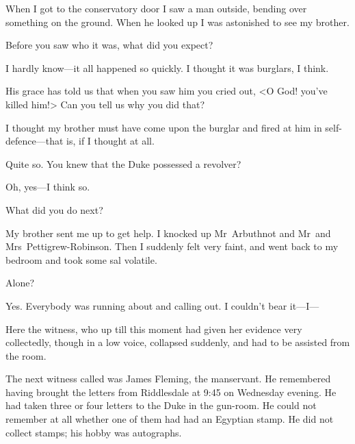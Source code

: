 \begin{dialogue}
  When I got to the conservatory door I saw a man outside, bending over something on the ground. When he looked up I was astonished to see my brother.

 Before you saw who it was, what did you expect?

 I hardly know—it all happened so quickly. I thought it was burglars, I think.

 His grace has told us that when you saw him you cried out, <O God! you've killed him!> Can you tell us why you did that?

  I thought my brother must have come upon the burglar and fired at him in self-defence—that is, if I thought at all.

 Quite so. You knew that the Duke possessed a revolver?

 Oh, yes—I think so.

 What did you do next?

 My brother sent me up to get help. I knocked up Mr~Arbuthnot and Mr~and Mrs~Pettigrew-Robinson. Then I suddenly felt very faint, and went back to my bedroom and took some sal volatile.

 Alone?

 Yes. Everybody was running about and calling out. I couldn't bear it—I—
\end{dialogue}

Here the witness, who up till this moment had given her evidence very collectedly, though in a low voice, collapsed suddenly, and had to be assisted from the room.


The next witness called was James Fleming, the manservant. He remembered having brought the letters from Riddlesdale at 9:45 on Wednesday evening. He had taken three or four letters to the Duke in the gun-room. He could not remember at all whether one of them had had an Egyptian stamp. He did not collect stamps; his hobby was autographs.

